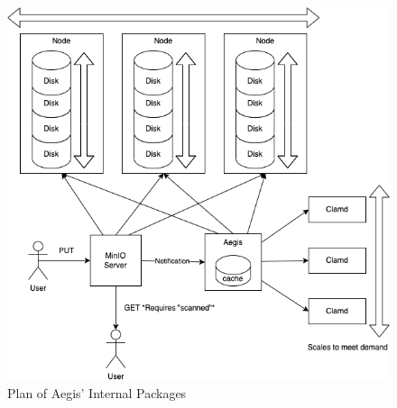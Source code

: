 \documentclass[12pt, conference, final, a4paper, onecolumn, compsoc]{IEEEtran}
\begin{document}
\begin{figure}
  \centering \includegraphics[scale=.3]{diagrams/aegis-class-diagram.png}
  \caption{Plan of Aegis' Internal Packages}
  \label{fig:aegisPlan}

\end{figure}
\end{document}
